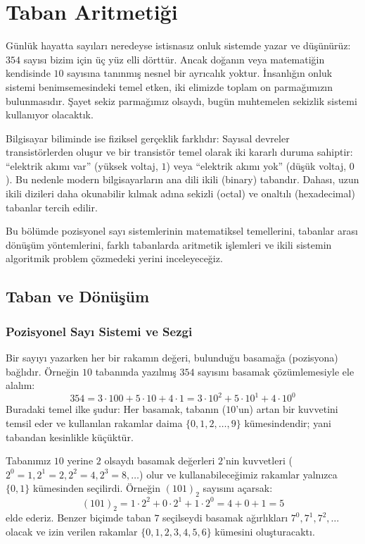 \chapter[Taban Aritmetiği · \textit{İleri}]{Taban Aritmetiği}

Günlük hayatta sayıları neredeyse istisnasız onluk sistemde yazar ve düşünürüz: $354$ sayısı bizim için üç yüz elli dörttür. Ancak doğanın veya matematiğin kendisinde $10$ sayısına tanınmış nesnel bir ayrıcalık yoktur. İnsanlığın onluk sistemi benimsemesindeki temel etken, iki elimizde toplam on parmağımızın bulunmasıdır. Şayet sekiz parmağımız olsaydı, bugün muhtemelen sekizlik sistemi kullanıyor olacaktık. 

Bilgisayar biliminde ise fiziksel gerçeklik farklıdır: Sayısal devreler transistörlerden oluşur ve bir transistör temel olarak iki kararlı duruma sahiptir: ``elektrik akımı var'' (yüksek voltaj, $1$) veya ``elektrik akımı yok'' (düşük voltaj, $0$). Bu nedenle modern bilgisayarların ana dili ikili (binary) tabandır. Dahası, uzun ikili dizileri daha okunabilir kılmak adına sekizli (octal) ve onaltılı (hexadecimal) tabanlar tercih edilir.

Bu bölümde pozisyonel sayı sistemlerinin matematiksel temellerini, tabanlar arası dönüşüm yöntemlerini, farklı tabanlarda aritmetik işlemleri ve ikili sistemin algoritmik problem çözmedeki yerini inceleyeceğiz.

\section{Taban ve Dönüşüm}

\subsection{Pozisyonel Sayı Sistemi ve Sezgi}

Bir sayıyı yazarken her bir rakamın değeri, bulunduğu basamağa (pozisyona) bağlıdır. Örneğin $10$ tabanında yazılmış $354$ sayısını basamak çözümlemesiyle ele alalım:
\[
354 = 3 \cdot 100 + 5 \cdot 10 + 4 \cdot 1 = 3 \cdot 10^2 + 5 \cdot 10^1 + 4 \cdot 10^0
\]
Buradaki temel ilke şudur: Her basamak, tabanın ($10$'un) artan bir kuvvetini temsil eder ve kullanılan rakamlar daima $\{0, 1, 2, \dots, 9\}$ kümesindendir; yani tabandan kesinlikle küçüktür.

Tabanımız $10$ yerine $2$ olsaydı basamak değerleri $2$'nin kuvvetleri ($2^0=1, 2^1=2, 2^2=4, 2^3=8, \dots$) olur ve kullanabileceğimiz rakamlar yalnızca $\{0, 1\}$ kümesinden seçilirdi. Örneğin $(101)_2$ sayısını açarsak:
\[
(101)_2 = 1 \cdot 2^2 + 0 \cdot 2^1 + 1 \cdot 2^0 = 4 + 0 + 1 = 5
\]
elde ederiz. Benzer biçimde taban $7$ seçilseydi basamak ağırlıkları $7^0, 7^1, 7^2, \dots$ olacak ve izin verilen rakamlar $\{0, 1, 2, 3, 4, 5, 6\}$ kümesini oluşturacaktı.

